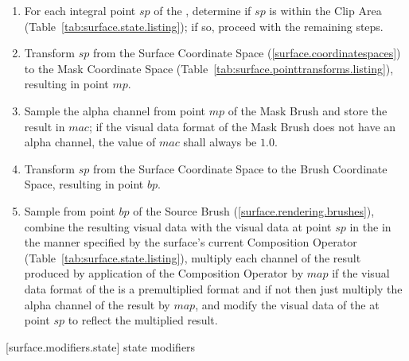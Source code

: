 \begin{enumerate}
\item For each integral point $sp$ of the \underlyingsurface, determine if $sp$ is within the Clip Area (Table~\ref{tab:surface.state.listing}); if so, proceed with the remaining steps.
\item Transform $sp$ from the Surface Coordinate Space (\ref{surface.coordinatespaces}) to the Mask Coordinate Space (Table~\ref{tab:surface.pointtransforms.listing}), resulting in point $mp$.
\item Sample the alpha channel from point $mp$ of the Mask Brush and store the result in $mac$; if the visual data format of the Mask Brush does not have an alpha channel, the value of $mac$ shall always be $1.0$.
\item Transform $sp$ from the Surface Coordinate Space to the Brush Coordinate Space, resulting in point $bp$.
\item Sample from point $bp$ of the Source Brush (\ref{surface.rendering.brushes}), combine the resulting visual data with the visual data at point $sp$ in the \underlyingsurface in the manner specified by the surface's current Composition Operator (Table~\ref{tab:surface.state.listing}), multiply each channel of the result produced by application of the Composition Operator by $map$ if the visual data format of the \underlyingsurface is a premultiplied format and if not then just multiply the alpha channel of the result by $map$, and modify the visual data of the \underlyingsurface at point $sp$ to reflect the multiplied result.
\end{enumerate}

 [surface.modifiers.state] { state modifiers}

